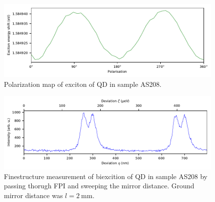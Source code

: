 \begin{figure}[H]
	\centering
	\includegraphics[width=\linewidth]{figures/fabry-perot/plots/measurement-fabry-perot-dot-exciton-pol-map}
	\caption{Polarization map of exciton of QD in sample AS208.}
	\label{fig:measurement-fabry-perot-dot-exciton-pol-map}
\end{figure}


\begin{figure}[H]
	\centering
	\includegraphics[width=1\linewidth]{figures/fabry-perot/plots/measurement-fabry-perot-dot-biexciton-FSS}
	\caption{Finestructure measurement of biexcition of QD in sample AS208 by passing thorugh FPI and sweeping the mirror distance.
	Ground mirror distance was  $l = \SI{2}{\milli \meter}$.}
	\label{fig:measurement-fabry-perot-dot-biexciton-fss}
\end{figure}




